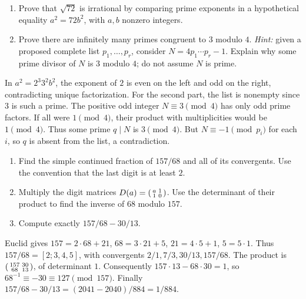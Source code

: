 \begin{enumerate}
\item Prove that $\sqrt{72}$ is irrational by comparing prime exponents
in a hypothetical equality $a^2=72b^2$, with $a,b$ nonzero integers.
\item Prove there are infinitely many primes congruent to $3$ modulo $4$.
\emph{Hint:} given a proposed complete list $p_1,\ldots,p_r$, consider
$N=4p_1\cdots p_r-1$. Explain why some prime divisor of $N$ is $3$ modulo $4$;
do not assume $N$ is prime. 
\end{enumerate}
\begin{solution}
In $a^2=2^3 3^2 b^2$, the exponent of $2$ is even on the left and odd
on the right, contradicting unique factorization. For the second part,
the list is nonempty since $3$ is such a prime. The positive odd integer
$N\equiv3\pmod4$ has only odd prime factors. If all were $1\pmod4$,
their product with multiplicities would be $1\pmod4$. Thus some prime
$q\mid N$ is $3\pmod4$. But $N\equiv-1\pmod{p_i}$ for each $i$, so
$q$ is absent from the list, a contradiction.
\end{solution}

\begin{enumerate}
\item Find the simple continued fraction of $157/68$ and all of its
convergents. Use the convention that the last digit is at least $2$.
\item Multiply the digit matrices
$D(a)=\begin{psmallmatrix}a&1\\1&0\end{psmallmatrix}$.
Use the determinant of their product to find the inverse of $68$ modulo $157$.
\item Compute exactly $157/68-30/13$. 
\end{enumerate}
\begin{solution}
Euclid gives $157=2\cdot68+21$, $68=3\cdot21+5$,
$21=4\cdot5+1$, $5=5\cdot1$. Thus $157/68=[2;3,4,5]$,
with convergents $2/1,7/3,30/13,157/68$.
The product is $\begin{psmallmatrix}157&30\\68&13\end{psmallmatrix}$,
of determinant $1$. Consequently $157\cdot13-68\cdot30=1$, so
$68^{-1}\equiv-30\equiv127\pmod{157}$.
Finally $157/68-30/13=(2041-2040)/884=1/884$.
\end{solution}

